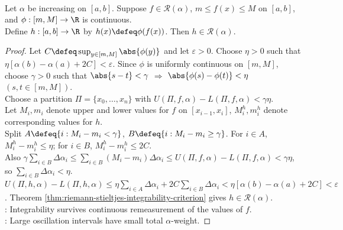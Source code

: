 \begin{theorem} \label{thm:continuous-composition-preserves-riemann-stieltjes-integrability} \\
Let $\alpha$ be increasing on $[a,b]$. Suppose $f\in\mathcal{R}(\alpha)$, $m\leq f(x)\leq M$ on $[a,b]$, and $\phi:[m,M]\to\R$ is continuous.\\
Define $h:[a,b]\to\R$ by $h(x)\defeq \phi(f(x))$. Then $h\in\mathcal{R}(\alpha)$.
\begin{proof}
Let $C\defeq\sup_{y\in[m,M]}\abs{\phi(y)}$ and let $\varepsilon>0$. Choose $\eta>0$ such that $\eta[\alpha(b)-\alpha(a)+2C]<\varepsilon$. Since $\phi$ is uniformly continuous on $[m,M]$, choose $\gamma>0$ such that $\abs{s-t}<\gamma$ $\Longrightarrow$ $\abs{\phi(s)-\phi(t)}<\eta$ $(s,t\in[m,M])$.\\
Choose a partition $\Pi=\{x_0,\ldots,x_n\}$ with $U(\Pi,f,\alpha)-L(\Pi,f,\alpha)<\gamma\eta$.\\
Let $M_i,m_i$ denote upper and lower values for $f$ on $[x_{i-1},x_i]$, $M_i^h,m_i^h$ denote corresponding values for $h$.\\
Split $A\defeq\{i:M_i-m_i<\gamma\}$, $B\defeq\{i:M_i-m_i\geq\gamma\}$. For $i\in A$, $M_i^h-m_i^h\leq\eta$; for $i\in B$, $M_i^h-m_i^h\leq2C$.\\
Also $\gamma\sum\limits_{i\in B}\Delta\alpha_i \leq \sum\limits_{i\in B}(M_i-m_i)\Delta\alpha_i \leq U(\Pi,f,\alpha)-L(\Pi,f,\alpha)<\gamma\eta$, so $\sum\limits_{i\in B}\Delta\alpha_i<\eta$.\\
$U(\Pi,h,\alpha)-L(\Pi,h,\alpha) \leq \eta\sum\limits_{i\in A}\Delta\alpha_i+2C\sum\limits_{i\in B}\Delta\alpha_i <\eta[\alpha(b)-\alpha(a)+2C]<\varepsilon$. Theorem \ref{thm:riemann-stieltjes-integrability-criterion} gives $h\in\mathcal{R}(\alpha)$.\\
: Integrability survives continuous remeasurement of the values of $f$.\\
: Large oscillation intervals have small total $\alpha$-weight.
\end{proof}
\end{theorem}

